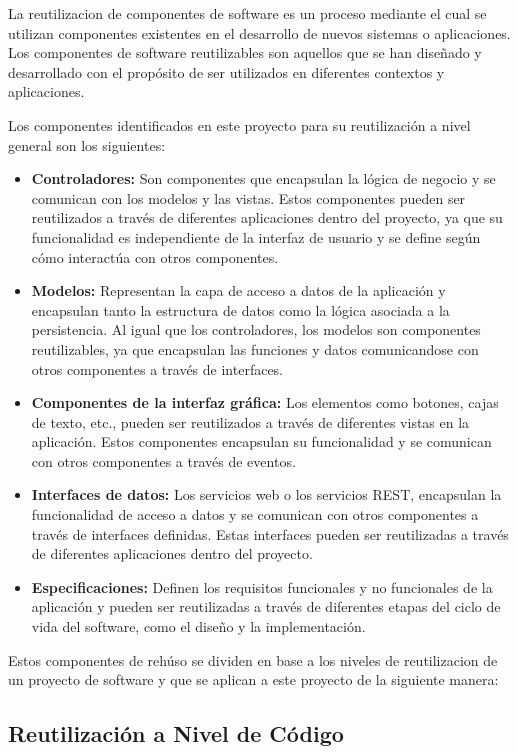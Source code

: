 \documentclass[runningheads]{llncs}
\begin{document}
La reutilizacion de componentes de software es un proceso mediante el cual se utilizan componentes existentes en el desarrollo de nuevos sistemas o aplicaciones. Los componentes de software reutilizables son aquellos que se han diseñado y desarrollado con el propósito de ser utilizados en diferentes contextos y aplicaciones.

Los componentes identificados en este proyecto para su reutilización a nivel general son los siguientes:
\begin{itemize}
    \item \textbf{Controladores: }Son componentes que encapsulan la lógica de negocio y se comunican con los modelos y las vistas. Estos componentes pueden ser reutilizados a través de diferentes aplicaciones dentro del proyecto, ya que su funcionalidad es independiente de la interfaz de usuario y se define según cómo interactúa con otros componentes.
    \item \textbf{Modelos: }Representan la capa de acceso a datos de la aplicación y encapsulan tanto la estructura de datos como la lógica asociada a la persistencia. Al igual que los controladores, los modelos son componentes reutilizables, ya que encapsulan las funciones y datos comunicandose con otros componentes a través de interfaces.
    \item \textbf{Componentes de la interfaz gráfica: }Los elementos como botones, cajas de texto, etc., pueden ser reutilizados a través de diferentes vistas en la aplicación. Estos componentes encapsulan su funcionalidad y se comunican con otros componentes a través de eventos.
    \item \textbf{Interfaces de datos: }Los servicios web o los servicios REST, encapsulan la funcionalidad de acceso a datos y se comunican con otros componentes a través de interfaces definidas. Estas interfaces pueden ser reutilizadas a través de diferentes aplicaciones dentro del proyecto.
    \item \textbf{Especificaciones: }Definen los requisitos funcionales y no funcionales de la aplicación y pueden ser reutilizadas a través de diferentes etapas del ciclo de vida del software, como el diseño y la implementación.
\end{itemize}   

Estos componentes de rehúso se dividen en base a los niveles de reutilizacion de un proyecto de software y que se aplican a este proyecto de la siguiente manera:

\subsection*{Reutilización a Nivel de Código}
\end{document}
